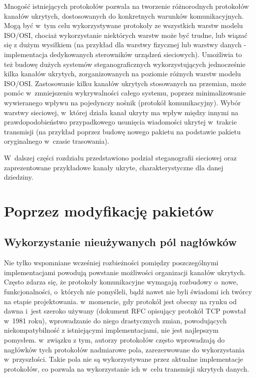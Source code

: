 \documentclass[a4paper, twoside, 12pt]{report}
\begin{document}
    Mnogość istniejących protokołów pozwala na tworzenie różnorodnych protokołów
    kanałów ukrytych, dostosowanych do konkretnych warunków komunikacyjnych.
    Mogą być w~tym celu wykorzystywane protokoły ze wszystkich warstw modelu
    ISO/OSI, chociaż wykorzystanie niektórych warstw może być trudne, lub wiązać
    się z dużym wysiłkiem (na przykład dla warstwy fizycznej lub warstwy danych -
    implementacja dedykowanych sterowników urządzeń sieciowych). Umożliwia to
    też budowę dużych systemów steganograficznych wykorzystujących jednocześnie
    kilka kanałów ukrytych, zorganizowanych na poziomie różnych warstw modelu ISO/OSI.
    Zastosowanie kilku kanałów ukrytych stosowanych na przemian, może pomóc w~zmniejszeniu
    wykrywalności całego systemu, poprzez minimalizowanie wywieranego wpływu na pojedynczy
    nośnik (protokół komunikacyjny). Wybór warstwy sieciowej, w~której działa kanał ukryty
    ma wpływ między innymi na prawdopodobieństwo przypadkowego usunięcia wiadomości
    ukrytej w~trakcie transmisji (na przykład poprzez budowę nowego pakietu na podstawie
    pakietu oryginalnego w~czasie trasowania).

    W~dalszej części rozdziału przedstawiono podział steganografii sieciowej
    oraz zaprezentowane przykładowe kanały ukryte, charakterystyczne dla danej
    dziedziny.
    \section{Poprzez modyfikację pakietów} \label{MODYFIKACJAPAKIETOW}
        \subsection{Wykorzystanie nieużywanych pól nagłówków}
        Nie tylko wspomniane wcześniej rozbieżności pomiędzy poszczególnymi
        implementacjami powodują powstanie możliwości organizacji kanałów ukrytych.
        Często zdarza się, że protokoły komunikacyjne wymagają rozbudowy o~nowe,
        funkcjonalności, o~których nie pomyśleli, bądź nawet nie byli świadomi
        ich twórcy na etapie projektowania. w~momencie, gdy protokół jest obecny
        na rynku od dawna i~jest szeroko używany (dokument RFC opisujący protokół TCP
        powstał w~1981 roku\cite{TCPRFC}), wprowadzanie do niego drastycznych zmian,
        powodujących niekompatybilność z istniejącymi implementacjami, nie jest
        najlepszym pomysłem. w~związku z tym, autorzy protokołów często wprowadzają
        do nagłówków tych protokołów nadmiarowe pola, zarezerwowane do wykorzystania
        w~przyszłości. Takie pola nie są wykorzystywane przez aktualne implementacje
        protokołów, co pozwala na wykorzystanie ich w~celu transmisji ukrytych danych.
\end{document}
